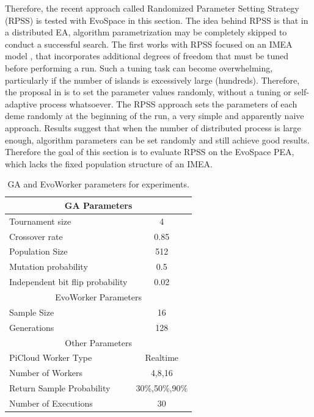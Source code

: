Therefore, the recent approach called Randomized Parameter Setting Strategy (RPSS) \cite{fuku1,fuku2} is tested with EvoSpace in this section.
The idea behind RPSS is that in a distributed EA, algorithm parametrization may be completely skipped to conduct a successful search.
The first works with RPSS focused on an IMEA model \cite{fuku1,fuku2}, that incorporates additional degrees of freedom that must be tuned before
performing a run.
Such a tuning task can become overwhelming, particularly if the number of islands is excessively large (hundreds).
Therefore, the proposal in \cite{fuku1} is to set the parameter values randomly, without a tuning or self-adaptive process whatsoever.
The RPSS approach sets the parameters of each deme randomly at the beginning of the run, a very simple and apparently naive approach.
Results suggest that when the number of distributed process is large enough, algorithm parameters can be set randomly and still achieve
good results.
Therefore the goal of this section is to evaluate RPSS on the EvoSpace PEA, which lacks the fixed population structure of an IMEA.

\begin{table}[!t]
\renewcommand{\arraystretch}{1.3}
\caption{GA and EvoWorker parameters for experiments.}
\label{tab:params}
\centering
\begin{tabular}{|l|c|}
\hline
\multicolumn{2}{|c|}{GA Parameters} \\
\hline
Tournament size & 4 \\
Crossover rate & 0.85  \\
Population Size & 512 \\
Mutation probability & 0.5 \\
Independent bit flip probability  & 0.02 \\
\hline
\multicolumn{2}{|c|}{EvoWorker Parameters} \\
\hline
Sample Size & 16 \\
Generations & 128 \\
\hline
\multicolumn{2}{|c|}{Other Parameters} \\
\hline
PiCloud Worker Type & Realtime \\
Number of Workers & 4,8,16 \\
Return Sample Probability & 30\%,50\%,90\% \\
Number of Executions & 30 \\

\hline

\end{tabular}
\end{table}

